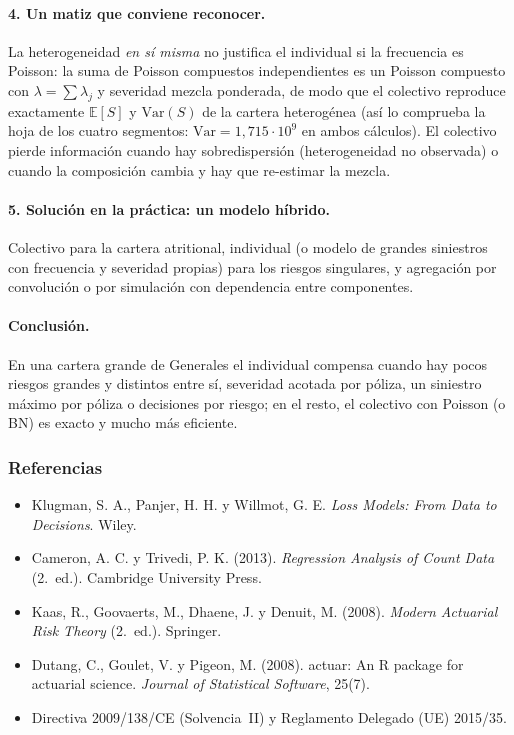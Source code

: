 \documentclass[a4paper,12pt]{article}
\newcommand{\E}{\mathbb{E}}
\newcommand{\Var}{\mathrm{Var}}
\begin{document}
\paragraph{4. Un matiz que conviene reconocer.} La heterogeneidad \emph{en s\'i misma} no justifica el individual si la frecuencia es Poisson: la suma de Poisson compuestos independientes es un Poisson compuesto con $\lambda=\sum\lambda_j$ y severidad mezcla ponderada, de modo que el colectivo reproduce exactamente $\E[S]$ y $\Var(S)$ de la cartera heterog\'enea (as\'i lo comprueba la hoja de los cuatro segmentos: $\Var=1{,}715\cdot10^9$ en ambos c\'alculos). El colectivo pierde informaci\'on cuando hay sobredispersi\'on (heterogeneidad no observada) o cuando la composici\'on cambia y hay que re-estimar la mezcla.

\paragraph{5. Soluci\'on en la pr\'actica: un modelo h\'ibrido.} Colectivo para la cartera atritional, individual (o modelo de grandes siniestros con frecuencia y severidad propias) para los riesgos singulares, y agregaci\'on por convoluci\'on o por simulaci\'on con dependencia entre componentes.

\paragraph{Conclusi\'on.} En una cartera grande de Generales el individual compensa cuando hay pocos riesgos grandes y distintos entre s\'i, severidad acotada por p\'oliza, un siniestro m\'aximo por p\'oliza o decisiones por riesgo; en el resto, el colectivo con Poisson (o BN) es exacto y mucho m\'as eficiente.

\subsubsection*{Referencias}
\begin{itemize}[leftmargin=*,itemsep=0pt]
\item Klugman, S. A., Panjer, H. H. y Willmot, G. E. \emph{Loss Models: From Data to Decisions}. Wiley.
\item Cameron, A. C. y Trivedi, P. K. (2013). \emph{Regression Analysis of Count Data} (2.\textordfeminine\ ed.). Cambridge University Press.
\item Kaas, R., Goovaerts, M., Dhaene, J. y Denuit, M. (2008). \emph{Modern Actuarial Risk Theory} (2.\textordfeminine\ ed.). Springer.
\item Dutang, C., Goulet, V. y Pigeon, M. (2008). actuar: An R package for actuarial science. \emph{Journal of Statistical Software}, 25(7).
\item Directiva 2009/138/CE (Solvencia~II) y Reglamento Delegado (UE) 2015/35.
\end{itemize}
\end{document}
